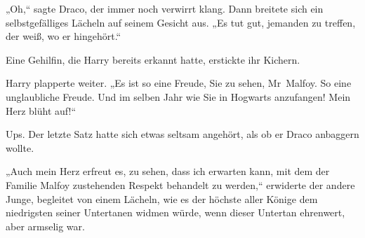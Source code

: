 „Oh,“ sagte Draco, der immer noch verwirrt klang. Dann breitete sich ein selbstgefälliges Lächeln auf seinem Gesicht aus. „Es tut gut, jemanden zu treffen, der weiß, wo er hingehört.“

Eine Gehilfin, die Harry bereits erkannt hatte, erstickte ihr Kichern.

Harry plapperte weiter. „Es ist so eine Freude, Sie zu sehen, Mr~Malfoy. So eine unglaubliche Freude. Und im selben Jahr wie Sie in Hogwarts anzufangen! Mein Herz blüht auf!“

Ups. Der letzte Satz hatte sich etwas seltsam angehört, als ob er Draco anbaggern wollte.

„Auch mein Herz erfreut es, zu sehen, dass ich erwarten kann, mit dem der Familie Malfoy zustehenden Respekt behandelt zu werden,“ erwiderte der andere Junge, begleitet von einem Lächeln, wie es der höchste aller Könige dem niedrigsten seiner Untertanen widmen würde, wenn dieser Untertan ehrenwert, aber armselig war.

